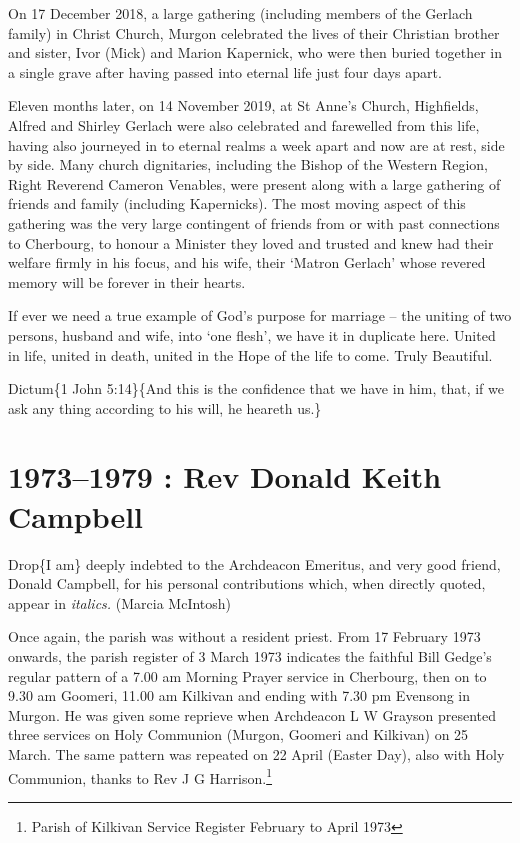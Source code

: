 On 17 December 2018, a large gathering (including members of the Gerlach family) in Christ Church, Murgon celebrated the lives of their Christian brother and sister, Ivor (Mick) and Marion Kapernick, who were then buried together in a single grave after having passed into eternal life just four days apart.

Eleven months later, on 14 November 2019, at St Anne's Church, Highfields, Alfred and Shirley Gerlach were also celebrated and farewelled from this life, having also journeyed in to eternal realms a week apart and now are at rest, side by side. Many church dignitaries, including the Bishop of the Western Region, Right Reverend Cameron Venables, were present along with a large gathering of friends and family (including Kapernicks). The most moving aspect of this gathering was the very large contingent of friends from or with past connections to Cherbourg, to honour a Minister they loved and trusted and knew had their welfare firmly in his focus, and his wife, their `Matron Gerlach' whose revered memory will be forever in their hearts.

If ever we need a true example of God's purpose for marriage -- the uniting of two persons, husband and wife, into `one flesh', we have it in duplicate here. United in life, united in death, united in the Hope of the life to come. Truly Beautiful.

Dictum\{1 John 5:14\}\{And this is the confidence that we have in him, that, if we ask any thing according to his will, he heareth us.\}

\hypertarget{rev-donald-keith-campbell}{%
\chapter{1973--1979 : Rev Donald Keith Campbell}\label{rev-donald-keith-campbell}}

Drop\{I am\} deeply indebted to the Archdeacon Emeritus, and very good friend, Donald Campbell, for his personal contributions which, when directly quoted, appear in \emph{italics.} (Marcia McIntosh)

Once again, the parish was without a resident priest. From 17 February 1973 onwards, the parish register of 3 March 1973 indicates the faithful Bill Gedge's regular pattern of a 7.00 am Morning Prayer service in Cherbourg, then on to 9.30 am Goomeri, 11.00 am Kilkivan and ending with 7.30 pm Evensong in Murgon. He was given some reprieve when Archdeacon L W Grayson presented three services on Holy Communion (Murgon, Goomeri and Kilkivan) on 25 March. The same pattern was repeated on 22 April (Easter Day), also with Holy Communion, thanks to Rev J G Harrison.\footnote{Parish of Kilkivan Service Register February to April 1973}

